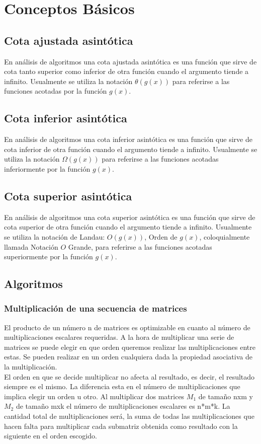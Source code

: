\documentclass[12pt,twoside]{article}
\begin{document}
\section{Conceptos Básicos}

\subsection{Cota ajustada asintótica}
En análisis de algoritmos una cota ajustada asintótica es una función que sirve de cota tanto superior como inferior de otra función cuando el argumento tiende a infinito. Usualmente se utiliza la notación $\theta(g(x))$ para referirse a las funciones acotadas por la función $g(x)$.\cite{cota}
\subsection{Cota inferior asintótica}
En análisis de algoritmos una cota inferior asintótica es una función que sirve de cota inferior de otra función cuando el argumento tiende a infinito. Usualmente se utiliza la notación $\Omega(g(x))$ para referirse a las funciones acotadas inferiormente por la función $g(x)$.\cite{cota}

\subsection{Cota superior asintótica}
En análisis de algoritmos una cota superior asintótica es una función que sirve de cota superior de otra función cuando el argumento tiende a infinito. Usualmente se utiliza la notación de Landau: $O(g(x))$, Orden de $g(x)$, coloquialmente llamada Notación $O$ Grande, para referirse a las funciones acotadas superiormente por la función $g(x)$.\cite{cota}

\subsection{Algoritmos} 
\subsubsection{Multiplicación de una secuencia de matrices}
El producto de un número n de matrices es optimizable en cuanto al número de multiplicaciones escalares requeridas. A la hora de multiplicar una serie de matrices se puede elegir en que orden queremos realizar las multiplicaciones entre estas. Se pueden realizar en un orden cualquiera dada la propiedad asociativa de la multiplicación.\\
El orden en que se decide multiplicar no afecta al resultado, es decir, el resultado siempre es el mismo. La diferencia esta en el número de multiplicaciones que implica elegir un orden u otro. Al multiplicar dos matrices $M_1$ de tamaño nxm y $M_2$ de tamaño mxk el número de multiplicaciones escalares es n*m*k. La cantidad total de multiplicaciones será, la suma de todas las multiplicaciones que hacen falta para multiplicar cada submatriz obtenida como resultado con la siguiente en el orden escogido.
\end{document}
